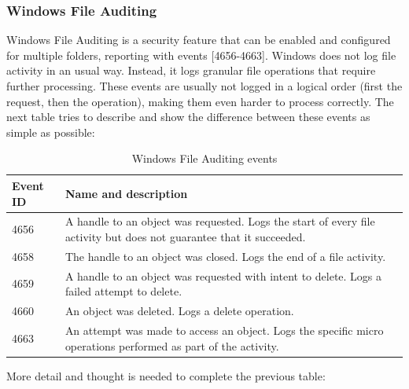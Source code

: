 \subsubsection{Windows File Auditing}
Windows File Auditing is a security feature that can be enabled and configured for multiple folders, reporting with events [4656-4663].
\linej
Windows does not log file activity in an usual way.
Instead, it logs granular file operations that require further processing.
These events are usually not logged in a logical order (first the request, then the operation), making them even harder to process correctly.
The next table tries to describe and show the difference between these events as simple as possible\cite{windows_events}\cite{events_46_56_X}:
\begin{table}[H]
	\begin{tabularx}{\textwidth}{|l|X|}
		\hline
		\rowcolor{gray!30}
		Event ID & Name and description\\ \hline
		4656& A handle to an object was requested. Logs the start of every file activity but does not guarantee that it succeeded.\\ \hline
		4658& The handle to an object was closed. Logs the end of a file activity.\\ \hline
		4659& A handle to an object was requested with intent to delete. Logs a failed attempt to delete.\\ \hline
		4660& An object was deleted. Logs a delete operation.\\ \hline
		4663& An attempt was made to access an object. Logs the specific micro operations performed as part of the activity.\\ \hline
	\end{tabularx}
	\caption{Windows File Auditing events}
\end{table}
\linej
More detail and thought is needed to complete the previous table\cite{windows_events}\cite{events_46_56_X}:
